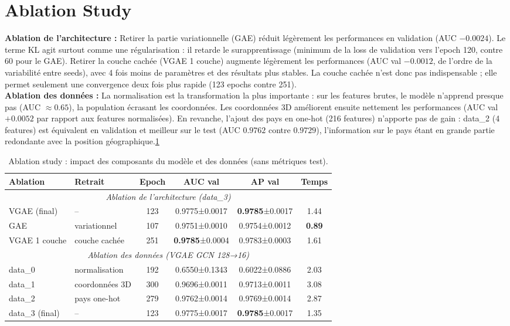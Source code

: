 \documentclass[french]{llncs}
\begin{document}
 \section{Ablation Study }
 \textbf{Ablation de l'architecture : }
Retirer la partie variationnelle (GAE) réduit légèrement les performances en validation (AUC $-0.0024$). Le terme KL agit surtout comme une régularisation : il retarde le surapprentissage (minimum de la loss de validation vers l'epoch 120, contre 60 pour le GAE). Retirer la couche cachée (VGAE 1 couche) augmente légèrement les performances (AUC val $-0.0012$, de l'ordre de la variabilité entre seeds), avec 4 fois moins de paramètres et des résultats plus stables. La couche cachée n'est donc pas indispensable ; elle permet seulement une convergence deux fois plus rapide (123 epochs contre 251).\\
\textbf{Ablation des données : }
La normalisation est la transformation la plus importante : sur les features brutes, le modèle n'apprend presque pas (AUC $\approx 0.65$), la population écrasant les coordonnées. Les coordonnées 3D améliorent ensuite nettement les performances (AUC val $+0.0052$ par rapport aux features normalisées). En revanche, l'ajout des pays en one-hot (216 features) n'apporte pas de gain : data\_2 (4 features) est équivalent en validation et meilleur sur le test (AUC $0.9762$ contre $0.9729$), l'information sur le pays étant en grande partie redondante avec la position géographique.\ref{tab_ablation}
{
\renewcommand{\arraystretch}{1.25}
\small
\begin{table}[H]
\centering
\caption{Ablation study : impact des composants du modèle et des données (sans métriques test).}
\label{tab_ablation}
\begin{tabular}{l l c c c c}
\toprule
\textbf{Ablation} & \textbf{Retrait} & \textbf{Epoch} &
\textbf{AUC val} & \textbf{AP val} & \textbf{Temps} \\
\midrule
\multicolumn{6}{c}{\textit{Ablation de l'architecture (data\_3)}} \\
\midrule
VGAE (final) & -- & 123 & 0.9775±0.0017 & \textbf{0.9785}±0.0017 & 1.44 \\
GAE & variationnel & 107 & 0.9751±0.0010 & 0.9754±0.0012 & \textbf{0.89} \\
VGAE 1 couche & couche cachée & 251 & \textbf{0.9785}±0.0004 & 0.9783±0.0003 & 1.61 \\
\midrule
\multicolumn{6}{c}{\textit{Ablation des données (VGAE GCN 128→16)}} \\
\midrule
data\_0 & normalisation & 192 & 0.6550±0.1343 & 0.6022±0.0886 & 2.03 \\
data\_1 & coordonnées 3D & 300 & 0.9696±0.0011 & 0.9713±0.0011 & 3.08 \\
data\_2 & pays one-hot & 279 & 0.9762±0.0014 & 0.9769±0.0014 & 2.87 \\
data\_3 (final) & -- & 123 & 0.9775±0.0017 & \textbf{0.9785}±0.0017 & 1.35 \\
\bottomrule
\end{tabular}
\end{table}
}
\end{document}
